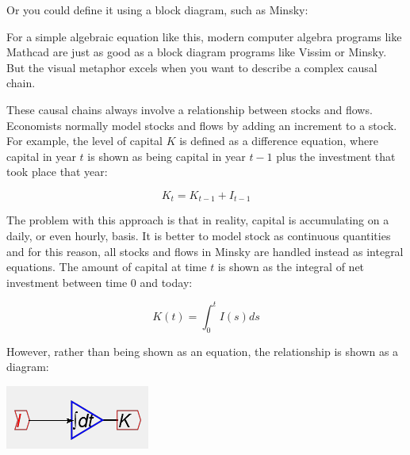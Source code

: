 Or you could define it using a block diagram, such as Minsky:


\begin{center}
\par\end{center}

For a simple algebraic equation like this, modern computer algebra
programs like Mathcad are just as good as a block diagram programs
like Vissim or Minsky. But the visual metaphor excels when you want
to describe a complex causal chain.

These causal chains always involve a relationship between stocks and
flows. Economists normally model stocks and flows by adding an increment
to a stock. For example, the level of capital $K$ is defined as a
difference equation, where capital in year $t$ is shown as being
capital in year $t-1$ plus the investment that took place that year:

\[
K_{t}=K_{t-1}+I_{t-1}
\]

The problem with this approach is that in reality, capital is accumulating
on a daily, or even hourly, basis. It is better to model stock as
continuous quantities and for this reason, all stocks and flows in
Minsky are handled instead as integral equations. The amount of capital
at time $t$ is shown as the integral of net investment between time
0 and today:

\[
K(t)=\int_{0}^{t}I(s)ds
\]

However, rather than being shown as an equation, the relationship
is shown as a diagram:
\begin{center}
\includegraphics{images/NewItem7} 
\par\end{center}

